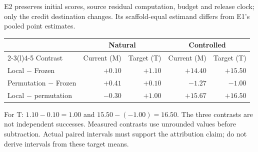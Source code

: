 \documentclass[10pt,letterpaper]{article}
\newcommand{\T}[1]{{\color{GuideBlue}#1}}
\newcommand{\note}[1]{{\fontsize{8.5}{10.5}\selectfont #1\par}}
\newcommand{\sectionhead}[1]{\vspace{7pt}{\large\bfseries #1}\par\vspace{3pt}}
\newenvironment{clean}{\begin{center}\fontsize{9.5}{11.5}\selectfont\setlength{\tabcolsep}{8pt}\renewcommand{\arraystretch}{1.10}}{\end{center}}
\begin{document}
\newpage
\sectionhead{2. Mechanism and learnable headroom}
E2 preserves initial scores, source residual computation, budget and release clock; only the credit destination changes. Its scaffold-equal estimand differs from E1's pooled point estimates.
\par\noindent\begin{minipage}{\linewidth}\end{minipage}\par
\begin{clean}
\begin{tabular}{@{}lrrrr@{}}
\toprule
& \multicolumn{2}{c}{Natural} & \multicolumn{2}{c}{Controlled} \\
\cmidrule(lr){2-3}\cmidrule(l){4-5}
Contrast & Current (M) & Target (T) & Current (M) & Target (T) \\
\midrule
Local $-$ Frozen & $+0.10$ & \T{$+1.10$} & $+14.40$ & \T{$+15.50$} \\
Permutation $-$ Frozen & $+0.41$ & \T{$+0.10$} & $-1.27$ & \T{$-1.00$} \\
Local $-$ permutation & $-0.30$ & \T{$+1.00$} & $+15.67$ & \T{$+16.50$} \\

\bottomrule
\end{tabular}
\end{clean}
\note{For T: $1.10-0.10=1.00$ and $15.50-(-1.00)=16.50$. The three contrasts are not independent successes. Measured contrasts use unrounded values before subtraction. Actual paired intervals must support the attribution claim; do not derive intervals from these target means.}
\end{document}
